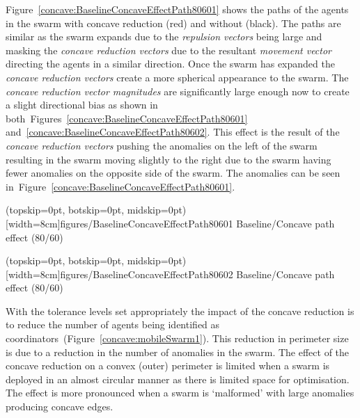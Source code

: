 \documentclass{ieeeaccess}
\begin{document}
Figure~\ref{concave:BaselineConcaveEffectPath80601} shows the paths of the agents in the swarm with concave reduction (red) and without (black). The paths are similar as the swarm expands due to the \textit{repulsion vectors} being large and masking the \textit{concave reduction vectors} due to the resultant \textit{movement vector} directing the agents in a similar direction. Once the swarm has expanded the \textit{concave reduction vectors} create a more spherical appearance to the swarm. The \textit{concave reduction vector magnitudes} are significantly large enough now to create a slight directional bias as shown in both~Figures~\ref{concave:BaselineConcaveEffectPath80601} and~\ref{concave:BaselineConcaveEffectPath80602}. This effect is the result of the \textit{concave reduction vectors} pushing the anomalies on the left of the swarm resulting in the swarm moving slightly to the right due to the swarm having fewer anomalies on the opposite side of the swarm. The anomalies can be seen in~Figure~\ref{concave:BaselineConcaveEffectPath80601}.

\Figure[t!](topskip=0pt, botskip=0pt, midskip=0pt)[width=8cm]{figures/BaselineConcaveEffectPath80601}
{Baseline/Concave path effect (80/60)\label{concave:BaselineConcaveEffectPath80601}}


\Figure[t!](topskip=0pt, botskip=0pt, midskip=0pt)[width=8cm]{figures/BaselineConcaveEffectPath80602}
{Baseline/Concave path effect (80/60)\label{concave:BaselineConcaveEffectPath80602}}


With the tolerance levels set appropriately the impact of the concave reduction is to reduce the number of agents being identified as coordinators~(Figure~\ref{concave:mobileSwarm1}). This reduction in perimeter size is due to a reduction in the number of anomalies in the swarm. The effect of the concave reduction on a convex (outer) perimeter is limited when a swarm is deployed in an almost circular manner as there is limited space for optimisation. The effect is more pronounced when a swarm is `malformed' with large anomalies producing concave edges.
\end{document}
